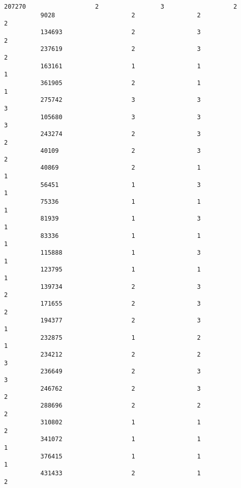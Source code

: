 \documentclass[11pt]{article}
\begin{document}
\begin{Verbatim}[commandchars=\\\{\}]
          207270                   2                 3                   2   
          9028                     2                 2                   2   
          134693                   2                 3                   2   
          237619                   2                 3                   2   
          163161                   1                 1                   1   
          361905                   2                 1                   1   
          275742                   3                 3                   3   
          105680                   3                 3                   3   
          243274                   2                 3                   2   
          40109                    2                 3                   2   
          40869                    2                 1                   1   
          56451                    1                 3                   1   
          75336                    1                 1                   1   
          81939                    1                 3                   1   
          83336                    1                 1                   1   
          115888                   1                 3                   1   
          123795                   1                 1                   1   
          139734                   2                 3                   2   
          171655                   2                 3                   2   
          194377                   2                 3                   1   
          232875                   1                 2                   1   
          234212                   2                 2                   3   
          236649                   2                 3                   3   
          246762                   2                 3                   2   
          288696                   2                 2                   2   
          310802                   1                 1                   2   
          341072                   1                 1                   1   
          376415                   1                 1                   1   
          431433                   2                 1                   2   
          

\end{Verbatim}
\end{document}
